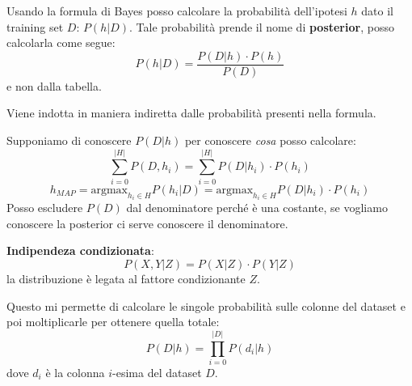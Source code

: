 Usando la formula di Bayes posso calcolare la probabilità dell'ipotesi $h$ dato
il training set $D$: $P(h|D)$. Tale probabilità prende il nome di \textbf{posterior},
posso calcolarla come segue:
\begin{equation}
    P(h|D) = \frac{P(D|h) \cdot P(h)}{P(D)}
\end{equation}
e non dalla tabella.

Viene indotta in maniera indiretta dalle probabilità presenti nella formula.

Supponiamo di conoscere $P(D| h)$ per conoscere \textit{cosa} posso calcolare:
\begin{equation}
    \sum_{i = 0}^{|H|} P(D, h_i) = \sum_{i = 0}^{|H|} P(D|h_i) \cdot P(h_i)
\end{equation}
\begin{equation}
    h_{MAP} = \text{argmax}_{h_i \in H} P(h_i|D) = \text{argmax}_{h_i \in H} P(D|h_i) \cdot P(h_i)
\end{equation}
Posso escludere $P(D)$ dal denominatore perché è una costante, se vogliamo
conoscere la posterior ci serve conoscere il denominatore.
\begin{definizione}
    \textbf{Indipendeza condizionata}:
    \begin{equation}
        P(X, Y|Z) = P(X|Z) \cdot P(Y|Z)
    \end{equation}
    la distribuzione è legata al fattore condizionante $Z$.
\end{definizione}
Questo mi permette di calcolare le singole probabilità sulle colonne del dataset
e poi moltiplicarle per ottenere quella totale:
\begin{equation}
    P(D| h) = \prod_{i = 0}^{|D|} P(d_i|h)
\end{equation}
dove $d_i$ è la colonna $i$-esima del dataset $D$.
